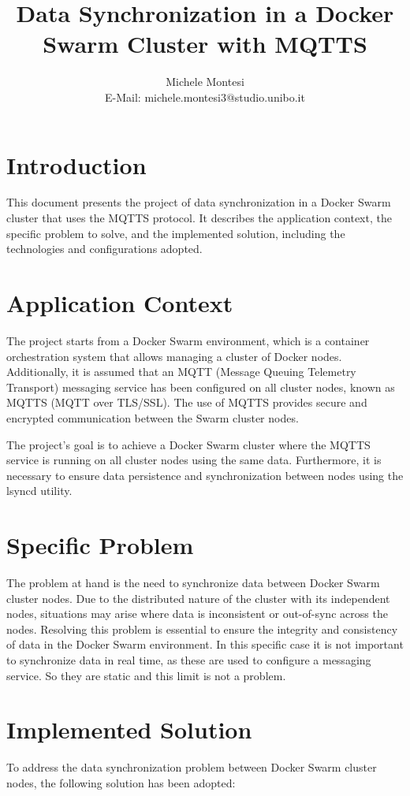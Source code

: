 \documentclass[a4paper, 12pt]{article}
\title{Data Synchronization in a Docker Swarm Cluster with MQTTS}
\author{Michele Montesi \\
        E-Mail: michele.montesi3@studio.unibo.it}
\begin{document}
\maketitle

\section{Introduction}
This document presents the project of data synchronization in a Docker Swarm cluster that uses 
the MQTTS protocol. It describes the application context, the specific problem 
to solve, and the implemented solution, including the technologies and configurations adopted.

\section{Application Context}
The project starts from a Docker Swarm environment, which is a container orchestration 
system that allows managing a cluster of Docker nodes. Additionally, it is assumed that an 
MQTT (Message Queuing Telemetry Transport) messaging service has been configured on all 
cluster nodes, known as MQTTS (MQTT over TLS/SSL). The use of MQTTS provides secure and 
encrypted communication between the Swarm cluster nodes.

The project's goal is to achieve a Docker Swarm cluster where the MQTTS service is 
running on all cluster nodes using the same data. Furthermore, it is necessary to ensure data 
persistence and synchronization between nodes using the lsyncd utility.

\newpage
\section{Specific Problem}
The problem at hand is the need to synchronize data between Docker Swarm cluster nodes. 
Due to the distributed nature of the cluster with its independent nodes, situations may 
arise where data is inconsistent or out-of-sync across the nodes. Resolving this problem 
is essential to ensure the integrity and consistency of data in the Docker Swarm environment.
In this specific case it is not important to synchronize data in real time, 
as these are used to configure a messaging service. So they are static and this limit 
is not a problem.

\section{Implemented Solution}
To address the data synchronization problem between Docker Swarm cluster nodes, the 
following solution has been adopted:
\end{document}
